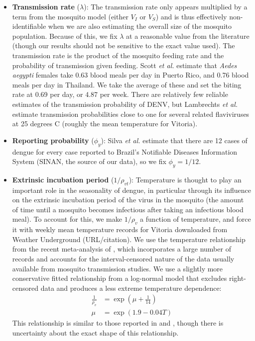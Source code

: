 \documentclass[12pt,letterpaper]{article}
\begin{document}
\begin{itemize}
\item \textbf{Transmission rate} ($\lambda$): The transmission rate only appears multiplied by a term from the mosquito model (either $V_I$ or $V_S$) and is thus effectively non-identifiable when we are also estimating the overall size of the mosquito population.
Because of this, we fix $\lambda$ at a reasonable value from the literature (though our results should not be sensitive to the exact value used).
The transmission rate is the product of the mosquito feeding rate and the probability of transmission given feeding.
Scott \textit{et al.} \cite{Scott2000} estimate that \textit{Aedes aegypti} females take 0.63 blood meals per day in Puerto Rico, and 0.76 blood meals per day in Thailand.
We take the average of these and set the biting rate at 0.69 per day, or 4.87 per week.
There are relatively few reliable estimates of the transmission probability of DENV, but Lambrechts \textit{et al.} \cite{Lambrechts2011} estimate transmission probabilities close to one  for several related flaviviruses at 25 degrees C (roughly the mean temperature for Vitoria).
\\
\item \textbf{Reporting probability} ($\phi_y$): Silva \textit{et al.} \cite{Silva2016} estimate that there are 12 cases of dengue for every case reported to Brazil's Notifiable Diseases Information System (SINAN, the source of our data), so we fix $\phi_y = 1/12$.
\\
\item \textbf{Extrinsic incubation period} ($1/\rho_{vt}$): Temperature is thought to play an important role in the seasonality of dengue, in particular through its influence on the extrinsic incubation period of the virus in the mosquito  (the amount of time until a mosquito becomes infectious after taking an infectious blood meal).
To account for this, we make $1/\rho_v$ a function of temperature, and force it with weekly mean temperature records for Vitoria downloaded from Weather Underground (URL/citation).
We use the temperature relationship from the recent meta-analysis of \cite{Chan2012}, which incorporates a large number of records and accounts for the interval-censored nature of the data usually available from mosquito transmission studies.
We use a slightly more conservative fitted relationship from a log-normal model that excludes right-censored data and produces a less extreme temperature dependence:
\begin{align}
\frac{1}{\rho_v} &= \exp \left(\mu + \frac{1}{14}\right)\\
\mu & = \exp(1.9 - 0.04 T)
\end{align}
This relationship is similar to those reported in \cite{Focks1995} and \cite{Tjaden2013}, though there is uncertainty about the exact shape of this relationship.
\end{itemize}



\end{document}
